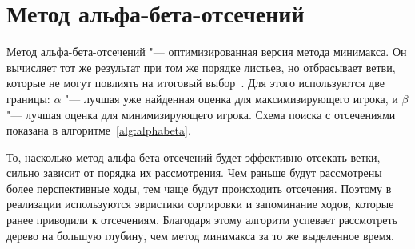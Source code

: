 \documentclass{csmathnotes}
\begin{document}
\section*{Метод альфа-бета-отсечений}

Метод альфа-бета-отсечений "--- оптимизированная версия метода минимакса. Он вычисляет тот же результат при том же порядке листьев, но отбрасывает ветви, которые не могут повлиять на итоговый выбор~\cite{Russell:2021}. Для этого используются две границы: $\alpha$ "--- лучшая уже найденная оценка для максимизирующего игрока, и $\beta$ "--- лучшая оценка для минимизирующего игрока. Схема поиска с отсечениями показана в алгоритме~\ref{alg:alphabeta}.

\begin{algorithm}[!tbp]
\caption{Метод альфа-бета-отсечений}\label{alg:alphabeta}
\end{algorithm}

То, насколько метод альфа-бета-отсечений будет эффективно отсекать ветки, сильно зависит от порядка их рассмотрения. Чем раньше будут рассмотрены более перспективные ходы, тем чаще будут происходить отсечения. Поэтому в реализации используются эвристики сортировки и запоминание ходов, которые ранее приводили к отсечениям. Благодаря этому алгоритм успевает рассмотреть дерево на большую глубину, чем метод минимакса за то же выделенное время.
\end{document}
